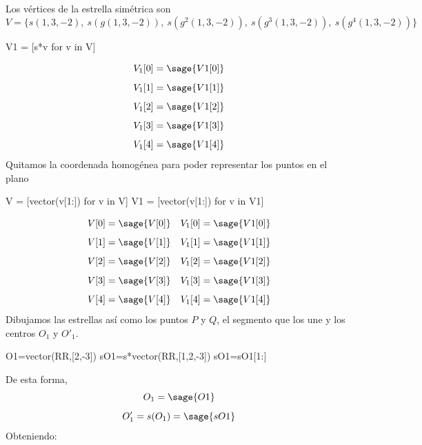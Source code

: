 \documentclass{amsart}
\begin{document}
Los vértices de la estrella simétrica son
$$V=\{s(1,3,-2), \ s(g(1,3,-2)), \ s(g^2(1,3,-2)), \ s(g^3(1,3,-2)), \ s(g^4(1,3,-2)) \}$$
\begin{sageblock}
V1 = [s*v for v in V]
\end{sageblock}
$$V_1[0]=\sage{V1[0]}$$
$$V_1[1]=\sage{V1[1]}$$
$$V_1[2]=\sage{V1[2]}$$
$$V_1[3]=\sage{V1[3]}$$
$$V_1[4]=\sage{V1[4]}$$
Quitamos la coordenada homogénea para poder representar los puntos en el plano

\begin{sageblock}
V = [vector(v[1:]) for v in V]
V1 = [vector(v[1:]) for v in V1]
\end{sageblock}
$$V[0]=\sage{V[0]} \quad V_1[0]=\sage{V1[0]}$$
$$V[1]=\sage{V[1]} \quad V_1[1]=\sage{V1[1]}$$
$$V[2]=\sage{V[2]} \quad V_1[2]=\sage{V1[2]}$$
$$V[3]=\sage{V[3]} \quad V_1[3]=\sage{V1[3]}$$
$$V[4]=\sage{V[4]} \quad V_1[4]=\sage{V1[4]}$$
Dibujamos las estrellas así como los puntos $P$ y $Q$, el segmento que los une y los centros $O_1$ y $O'_1$.

\begin{sageblock}
O1=vector(RR,[2,-3])
sO1=s*vector(RR,[1,2,-3])
sO1=sO1[1:]
\end{sageblock}
De esta forma,
$$O_1=\sage{O1}$$
$$O'_1=s(O_1)=\sage{sO1}$$
Obteniendo:

\begin{sagesub}
\begin{center}
\end{center}
\end{sagesub}
\end{document}
